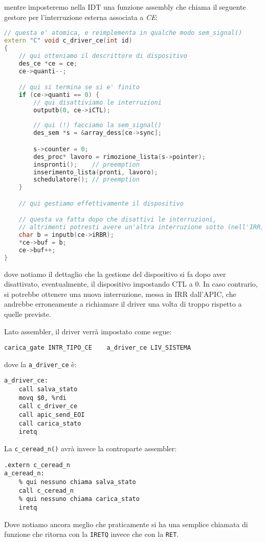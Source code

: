 \documentclass[a4paper,11pt]{article}
\begin{document}
mentre imposteremo nella IDT una funzione assembly che chiama il seguente gestore per l'interruzione esterna associata a \textit{CE}:
\begin{lstlisting}[language=C++, style=codestyle]	
// questa e' atomica, e reimplementa in qualche modo sem_signal()
extern "C" void c_driver_ce(int id)
{
	// qui otteniamo il descrittore di dispositivo
	des_ce *ce = ce;
	ce->quanti--;

	// qui si termina se si e' finito
	if (ce->quanti == 0) {
		// qui disattiviamo le interruzioni
		outputb(0, ce->iCTL);
		
		// qui (!) facciamo la sem_signal()
		des_sem *s = &array_dess[ce->sync];

		s->counter = 0;
		des_proc* lavoro = rimozione_lista(s->pointer);
		inspronti();	// preemption
		inserimento_lista(pronti, lavoro);
		schedulatore();	// preemption
	}

	// qui gestiamo effettivamente il dispositivo 

	// questa va fatta dopo che disattivi le interruzioni,
	// altrimenti potresti avere un'altra interruzione sotto (nell'IRR)
	char b = inputb(ce->iRBR);
	*ce->buf = b;
	ce->buf++;
}
\end{lstlisting}
dove notiamo il dettaglio che la gestione del dispositivo si fa dopo aver disattivato, eventualmente, il dispositivo impostando CTL a 0.
In caso contrario, si potrebbe ottenere una nuova interruzione, messa in IRR dall'APIC, che andrebbe erroneamente a richiamare il driver una volta di troppo rispetto a quelle previste.

Lato assembler, il driver verrà impostato come segue:
\begin{lstlisting}[language=assembler, style=codestyle]	
% setup IDT
carica_gate	INTR_TIPO_CE	a_driver_ce	LIV_SISTEMA
\end{lstlisting}
dove la \lstinline|a_driver_ce| è:
\begin{lstlisting}[language=assembler, style=codestyle]	
a_driver_ce:
	call salva_stato
	movq $0, %rdi
	call c_driver_ce
	call apic_send_EOI
	call carica_stato
	iretq
\end{lstlisting}

La \lstinline|c_ceread_n()| avrà invece la controparte assembler:
\begin{lstlisting}[language=assembler, style=codestyle]	
	.extern	c_ceread_n
a_ceread_n:
	% qui nessuno chiama salva_stato
	call c_ceread_n
	% qui nessuno chiama carica_stato
	iretq
\end{lstlisting}
Dove notiamo ancora meglio che praticamente si ha una semplice chiamata di funzione che ritorna con la \lstinline|IRETQ| invece che con la \lstinline|RET|. 
\end{document}
